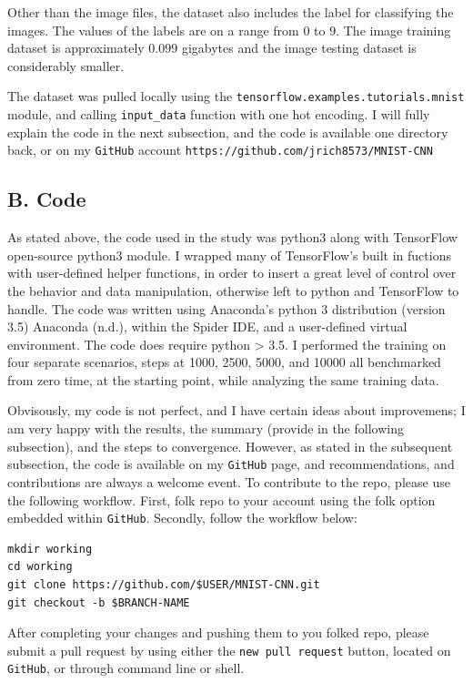 \documentclass[conference,final,]{IEEEtran}
\begin{document}
Other than the image files, the dataset also includes the label for
classifying the images. The values of the labels are on a range from
\(0\) to \(9\). The image training dataset is approximately \(0.099\)
gigabytes and the image testing dataset is considerably smaller.

The dataset was pulled locally using the
\texttt{tensorflow.examples.tutorials.mnist} module, and calling
\texttt{input\_data} function with one hot encoding. I will fully
explain the code in the next subsection, and the code is available one
directory back, or on my \texttt{GitHub} account
\texttt{https://github.com/jrich8573/MNIST-CNN}

\subsection{B. Code}\label{b.-code}

As stated above, the code used in the study was python3 along with
TensorFlow open-source python3 module. I wrapped many of TensorFlow's
built in fuctions with user-defined helper functions, in order to insert
a great level of control over the behavior and data manipulation,
otherwise left to python and TensorFlow to handle. The code was written
using Anaconda's python 3 distribution (version 3.5) Anaconda (n.d.),
within the Spider IDE, and a user-defined virtual environment. The code
does require python \textgreater{} 3.5. I performed the training on four
separate scenarios, steps at 1000, 2500, 5000, and 10000 all benchmarked
from zero time, at the starting point, while analyzing the same training
data.

Obvisously, my code is not perfect, and I have certain ideas about
improvemens; I am very happy with the results, the summary (provide in
the following subsection), and the steps to convergence. However, as
stated in the subsequent subsection, the code is available on my
\texttt{GitHub} page, and recommendations, and contributions are always
a welcome event. To contribute to the repo, please use the following
workflow. First, folk repo to your account using the folk option
embedded within \texttt{GitHub}. Secondly, follow the workflow below:

\begin{verbatim}
mkdir working               
cd working              
git clone https://github.com/$USER/MNIST-CNN.git                
git checkout -b $BRANCH-NAME
\end{verbatim}

After completing your changes and pushing them to you folked repo,
please submit a pull request by using either the
\texttt{new\ pull\ request} button, located on \texttt{GitHub}, or
through command line or shell.
\end{document}
